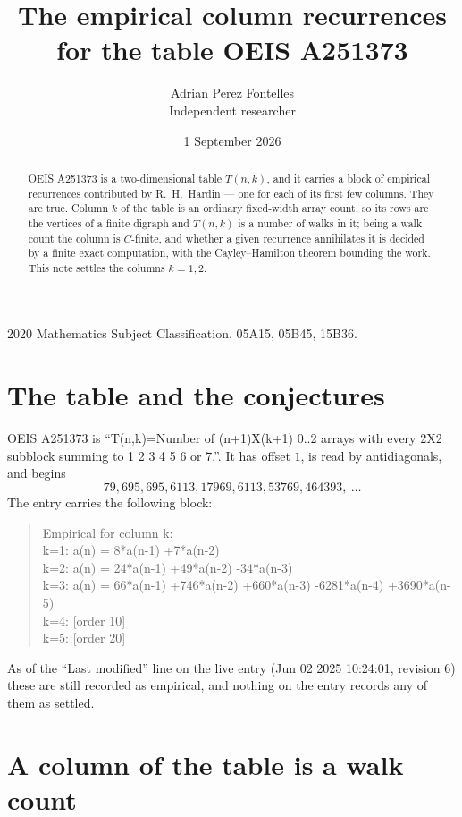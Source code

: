 \documentclass[11pt,a4paper]{article}
\title{The empirical column recurrences for the table OEIS A251373}
\author{Adrian Perez Fontelles\\ \small Independent researcher}
\date{1 September 2026}
\theoremstyle{plain}
\theoremstyle{definition}
\begin{document}
\maketitle

\begin{abstract}
OEIS A251373 is a two-dimensional table $T(n,k)$, and it carries a block of empirical
recurrences contributed by R.~H.~Hardin --- one for each of its first few columns. They are
true. Column $k$ of the table is an ordinary fixed-width array count, so its rows are the
vertices of a finite digraph and $T(n,k)$ is a number of walks in it; being a walk count the
column is $C$-finite, and whether a given recurrence annihilates it is decided by a finite
exact computation, with the Cayley--Hamilton theorem bounding the work. This note settles the
columns $k=1, 2$.
\end{abstract}

\noindent\small 2020 Mathematics Subject Classification. 05A15, 05B45, 15B36.\normalsize

\section{The table and the conjectures}

OEIS A251373 is ``T(n,k)=Number of (n+1)X(k+1) 0..2 arrays with every 2X2 subblock summing to 1 2 3 4 5 6 or 7.''. It has offset $1$, is
read by antidiagonals, and begins
\[
79, 695, 695, 6113, 17969, 6113, 53769, 464393,\ \dots
\]
The entry carries the following block:
\begin{quote}\small
Empirical for column k:\\
k=1: a(n) = 8*a(n-1) +7*a(n-2)\\
k=2: a(n) = 24*a(n-1) +49*a(n-2) -34*a(n-3)\\
k=3: a(n) = 66*a(n-1) +746*a(n-2) +660*a(n-3) -6281*a(n-4) +3690*a(n-5)\\
k=4: [order 10]\\
k=5: [order 20]\\
\end{quote}
As of the ``Last modified'' line on the live entry (Jun 02 2025 10:24:01, revision 6) these are still
recorded as empirical, and nothing on the entry records any of them as settled.

\section{A column of the table is a walk count}
\end{document}
